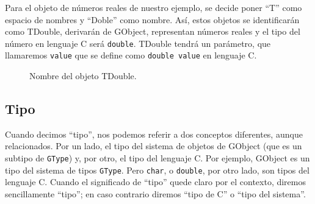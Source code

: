 Para el objeto de números reales de nuestro ejemplo, se decide poner ``\textsf{T}'' como espacio
de nombres y ``\textsf{Doble}'' como nombre. Así, estos objetos se identificarán como \textsf{TDouble},
derivarán de \textsf{GObject}, representan números reales y el tipo del número en
lenguaje C será \texttt{double}. \textsf{TDouble} tendrá un parámetro, que llamaremos
\texttt{value} que se  define como \texttt{double value} en lenguaje C.

\begin{figure}[ht]
  \centering
  \def\scl{1.4}
\caption{Nombre del objeto \textsf{TDouble}.}
\label{fig:nombre-objetos}
\end{figure}

\subsection{Tipo}
Cuando decimos ``tipo'', nos podemos referir a dos conceptos diferentes, aunque relacionados.
Por un lado, el tipo del sistema de objetos de \textsf{GObject} (que es un subtipo de \texttt{GType}) y,
por otro, el tipo del lenguaje C. Por ejemplo, \textsf{GObject} es un tipo del sistema de tipos \texttt{GType}.
Pero \texttt{char}, o \texttt{double}, por otro lado, son tipos del lenguaje C.
Cuando el significado de ``tipo'' quede claro por el contexto, diremos sencillamente ``tipo''; en caso contrario
diremos ``tipo de C'' o ``tipo del sistema''.

